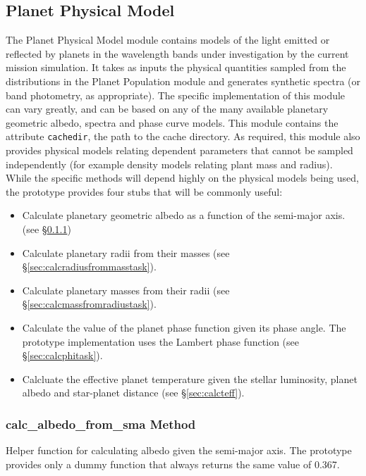 \documentclass[cleanfoot]{asme2ej}
\begin{document}
\subsection{Planet Physical Model} \label{sec:planetphysicalmodel}
The Planet Physical Model module contains models of the light emitted or reflected by planets in the wavelength bands under investigation by the current mission simulation.  It takes as inputs the physical quantities sampled from the distributions in the Planet Population module and generates synthetic spectra (or band photometry, as appropriate).  The specific implementation of this module can vary greatly, and can be based on any of the many available planetary geometric albedo, spectra and phase curve models.  This module contains the attribute \texttt{cachedir}, the path to the cache directory. As required, this module also provides physical models relating dependent parameters that cannot be sampled independently (for example density models relating plant mass and radius).  While the specific methods will depend highly on the physical models being used, the prototype provides four stubs that will be commonly useful:
\begin{itemize}[leftmargin=2in,font={\ttfamily}]
    \item[\texttt calc\_albedo\_from\_sma] Calculate planetary geometric albedo as a function of the semi-major axis. (see \S\ref{sec:calcalbedofromsmatask})
    \item[\texttt calc\_radius\_from\_mass] Calculate planetary radii from their masses (see \S\ref{sec:calcradiusfrommasstask}).
    \item[\texttt calc\_mass\_from\_radius] Calculate planetary masses from their radii (see \S\ref{sec:calcmassfromradiustask}).
    \item[\texttt calc\_Phi] Calculate the value of the planet phase function given its phase angle. The prototype implementation uses the Lambert phase function (see \S\ref{sec:calcphitask}).
    \item[\texttt calc\_Teff] Calcluate the effective planet temperature given the stellar luminosity, planet albedo and star-planet distance (see \S\ref{sec:calcteff}).
\end{itemize}

\subsubsection{calc\_albedo\_from\_sma Method} \label{sec:calcalbedofromsmatask}
Helper function for calculating albedo given the semi-major axis. The prototype provides only a dummy function that always returns the same value of 0.367.
\end{document}
